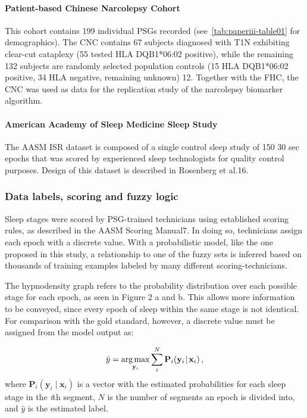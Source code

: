 \paragraph{Patient-based Chinese Narcolepsy Cohort}
This cohort contains 199 individual PSGs recorded (see~\cref{tab:paperiii-table01} for demographics).
The CNC contains 67 subjects diagnosed with T1N exhibiting clear-cut cataplexy (55 tested HLA DQB1*06:02 positive), while the remaining 132 subjects are randomly selected population controls (15 HLA DQB1*06:02 positive, 34 HLA negative, remaining unknown) 12.
Together with the FHC, the CNC was used as data for the replication study of the narcolepsy biomarker algorithm.

\paragraph{American Academy of Sleep Medicine Sleep Study}
The AASM ISR dataset is composed of a single control sleep study of 150 30 sec epochs that was scored by  experienced sleep technologists for quality control purposes.
Design of this dataset is described in Rosenberg et al.16.

\subsubsection{Data labels, scoring and fuzzy logic}
Sleep stages were scored by PSG-trained technicians using established scoring rules, as described in the AASM Scoring Manual7.
In doing so, technicians assign each epoch with a discrete value.
With a probabilistic model, like the one proposed in this study, a relationship to one of the fuzzy sets is inferred based on thousands of training examples labeled by many different scoring-technicians. 

The hypnodensity graph refers to the probability distribution over each possible stage for each epoch, as seen in Figure 2 a and b.
This allows more information to be conveyed, since every epoch of sleep within the same stage is not identical. For comparison with the gold standard, however, a discrete value must be assigned from the model output as:

\begin{equation}
    \hat{y} = \operatorname*{arg\,max}_{\mathbf{y}_{i}} \sum_{i}^{N} \mathbf{P}_i \! \left( \mathbf{y}_i \! \mid \! \mathbf{x}_i \right),
\end{equation}
where $\mathbf{P}_i \! \left( \mathbf{y}_i \! \mid \! \mathbf{x}_i \right)$ is a vector with the estimated probabilities for each sleep stage in the \textit{i}th segment, $N$ is the number of segments an epoch is divided into, and $\hat{y}$ is the estimated label. 

